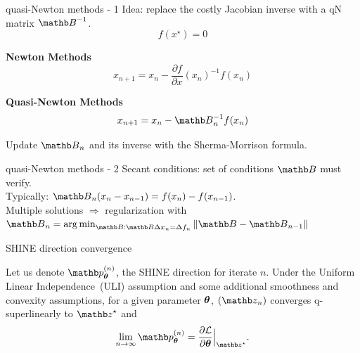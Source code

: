 \begin{frame}{quasi-Newton methods - 1}
    Idea: replace the costly Jacobian inverse with a qN matrix $\Bb^{-1}$.\\
    \begin{equation*}
        f(x^\star) = 0
    \end{equation*}
    \begin{multicols}{2}

            \begin{center}
                \textbf{Newton Methods}
                \begin{equation*}
                    x_{n+1} = x_n -\frac{\partial f}{\partial x}(x_n)^{-1}f(x_n)
                \end{equation*}
            \end{center}
            \newpage
            \begin{center}
                \textbf{Quasi-Newton Methods}
                \begin{equation*}
                    x_{n+1} = x_n -\Bb_n^{-1}f(x_n)
                \end{equation*}
            \end{center}
            Update $\Bb_n$ and its inverse with the Sherma-Morrison formula.
    \end{multicols}
\end{frame}

\begin{frame}{quasi-Newton methods - 2}
    Secant conditions: set of conditions $\Bb$ must verify.\\
    Typically: $\Bb_n(x_n - x_{n-1}) = f(x_n) - f(x_{n-1})$.\\
    Multiple solutions $\Rightarrow$ regularization with $\Bb_n = \argmin_{\Bb: \Bb \Delta x_n = \Delta f_n} \|\Bb - \Bb_{n-1}\|$
\end{frame}

\begin{frame}{SHINE direction convergence}
    \begin{theorem}
        Let us denote $\pb_\thetab^{(n)}$, the SHINE direction for iterate $n$.
        Under the Uniform Linear Independence~(ULI) assumption and some additional smoothness and convexity assumptions, for a given parameter ${\boldsymbol{\theta}}$, $(\zb_n)$ converges q-superlinearly to $\zb^\star$ and
        \begin{equation*}
            \lim_{n \to \infty} \pb_\thetab^{(n)} = \frac{\partial \mathcal{L}}{\partial \thetab}\Bigr|_{\zb^\star}.
        \end{equation*}
        \end{theorem}
\end{frame}

